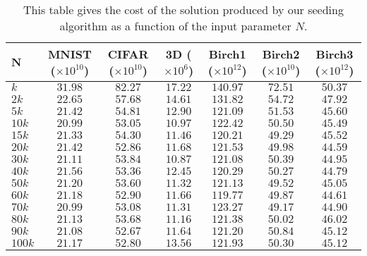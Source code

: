 \begin{table}[h]
\centering
\begin{tabular}{| l | c | c | c | c | c | c |}
\hline
 $\mathbf{N}$ & \pbox{2cm}{{\bf MNIST} \\\tiny($\times 10^{10}$)} & \pbox{2cm}{{\bf CIFAR} \\ \tiny{($\times 10^{10}$)}} & \pbox{2cm}{{\bf 3D} \\ \tiny{($\times 10^6$)}} & \pbox{2cm}{{\bf Birch1} \\ \tiny{($\times 10^{12}$)}} & \pbox{2cm}{{\bf Birch2} \\\tiny{($\times 10^{10}$)}} & \pbox{2cm}{{\bf Birch3} \\ \tiny{($\times 10^{12}$)}} \\
\hline \hline
$k$ & $31.98$	& $82.27$ & $17.22$ & $140.97$ & $72.51$ & $50.37$\\ 
\hline
$2k$ & $22.65$ & $57.68$ & $14.61$ & $131.82$ & $54.72$ & $47.92$\\ 
\hline
$5k$ & $21.42$ & $54.81$ & $12.90$ & $121.09$ & $51.53$ & $45.60$\\ 
\hline
$10k$ & $20.99$ & $53.05$ & $10.97$ & $122.42$ & $50.50$ & $45.49$\\ 
\hline
$15k$ & $21.33$ & $54.30$ & $11.46$ & $120.21$ & $49.29$ & $45.52$\\ 
\hline
$20k$ & $21.42$ & $52.86$ & $11.68$ & $121.53$ & $49.98$ & $44.59$\\ 
\hline
$30k$ & $21.11$ & $53.84$ & $10.87$ & $121.08$ & $50.39$ & $44.95$\\ 
\hline
$40k$ & $21.56$ & $53.36$ & $12.45$ & $120.29$ & $50.27$ & $44.79$\\ 
\hline
$50k$ & $21.20$ & $53.60$ & $11.32$ & $121.13$ & $49.52$ & $45.05$\\ 
\hline
$60k$ & $21.18$ & $52.90$ & $11.66$ & $119.77$ & $49.87$ & $44.61$\\ 
\hline
$70k$ & $20.99$ & $53.08$ & $11.31$ & $123.27$ & $49.17$ & $44.90$\\ 
\hline
$80k$ & $21.13$ & $53.68$ & $11.16$ & $121.38$ & $50.02$ & $46.02$\\ 
\hline
$90k$ & $21.08$ & $52.67$ & $11.64$ & $121.20$ & $50.84$ & $45.12$\\ 
\hline
$100k$ & $21.17$ & $52.80$ & $13.56$ & $121.93$ & $50.30$ & $45.12$\\ 
\hline
\end{tabular}
\caption{This table gives the cost of the solution produced by our seeding algorithm as a function of the input parameter $N$.}
\label{table:s1}
\end{table}